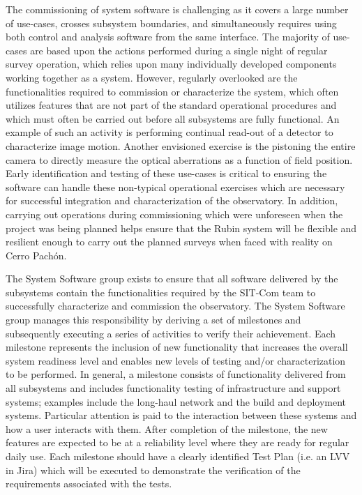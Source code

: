 \documentclass[SE,lsstdraft,authoryear,toc]{lsstdoc, lsstdraft}
\begin{document}
The commissioning of system software is challenging as it covers a large number of use-cases, crosses subsystem boundaries, and simultaneously requires using both control and analysis software from the same interface.
The majority of use-cases are based upon the actions performed during a single night of regular survey operation, which relies upon many individually developed components working together as a system.
However, regularly overlooked are the functionalities required to commission or characterize the system, which often utilizes features that are not part of the standard operational procedures and which must often be carried out before all subsystems are fully functional.
An example of such an activity is performing continual read-out of a detector to characterize image motion.
Another envisioned exercise is the pistoning the entire camera to directly measure the optical aberrations as a function of field position.
Early identification and testing of these use-cases is critical to ensuring the software can handle these non-typical operational exercises which are necessary for successful integration and characterization of the observatory.
In addition, carrying out operations during commissioning which were unforeseen when the project was being planned helps ensure that the Rubin system will be flexible and resilient enough to carry out the planned surveys when faced with reality on Cerro Pach\'{o}n.

The System Software group exists to ensure that all software delivered by the subsystems contain the functionalities required by the SIT-Com team to successfully characterize and commission the observatory.
The System Software group manages this responsibility by deriving a set of milestones and subsequently executing a series of activities to verify their achievement.
Each milestone represents the inclusion of new functionality that increases the overall system readiness level and enables new levels of testing and/or characterization to be performed.
In general, a milestone consists of functionality delivered from all subsystems and includes functionality testing of infrastructure and support systems; examples include the long-haul network and the build and deployment systems.
Particular attention is paid to the interaction between these systems and how a user interacts with them.
After completion of the milestone, the new features are expected to be at a reliability level where they are ready for regular daily use.
Each milestone should have a clearly identified Test Plan (i.e. an LVV in Jira) which will be executed to demonstrate the verification of the requirements associated with the tests.
\end{document}
